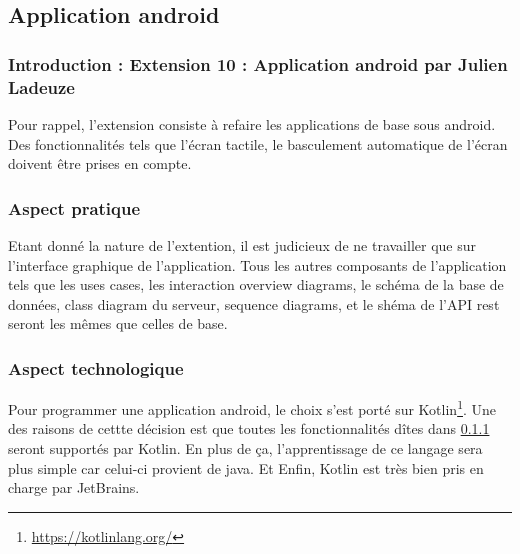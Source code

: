 \subsection{Application android}
\subsubsection{Introduction : Extension 10 : Application android par Julien Ladeuze}\label{INTRODUCTION}
\begin{flushleft}
Pour rappel, l'extension consiste à refaire les applications de base sous android. Des fonctionnalités tels que l'écran tactile, le basculement automatique de l'écran doivent être prises en compte.
\end{flushleft}
\subsubsection{Aspect pratique}
\begin{flushleft}
Etant donné la nature de l'extention, il est judicieux de ne travailler que sur l'interface graphique de l'application. Tous les autres composants de l'application tels que les uses cases, les interaction overview diagrams, le schéma de la base de données, class diagram du serveur, sequence diagrams, et le shéma de l'API rest seront les mêmes que celles de base.
\end{flushleft}
\subsubsection{Aspect technologique}
\begin{flushleft}
Pour programmer une application android, le choix s'est porté sur Kotlin\footnote{\url{https://kotlinlang.org/}}. Une des raisons de cettte décision est que toutes les fonctionnalités dîtes dans \ref{INTRODUCTION} seront supportés par Kotlin. En plus de ça, l'apprentissage de ce langage sera plus simple car celui-ci provient de java. Et Enfin, Kotlin est très bien pris en charge par JetBrains.
\end{flushleft}
